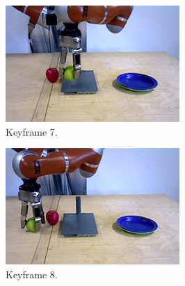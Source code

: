 \begin{figure}\ContinuedFloat
  \centering
  \begin{subfigure}[t]{0.475\textwidth}
    \includegraphics[width=\textwidth]{./figures/sec/planning/exec2/frame2212.jpg}
    \caption{Keyframe 7.}
    \label{fig:sec_usingaffordanceforplanning_results_scenario2_7}
  \end{subfigure}
  \hfill
  \begin{subfigure}[t]{0.475\textwidth}
    \includegraphics[width=\textwidth]{./figures/sec/planning/exec2/frame2395.jpg}
    \caption{Keyframe 8.}
    \label{fig:sec_usingaffordanceforplanning_results_scenario2_8}
  \end{subfigure}\\%
  \begin{subfigure}[t]{0.475\textwidth}

\end{subfigure}
\end{figure}
